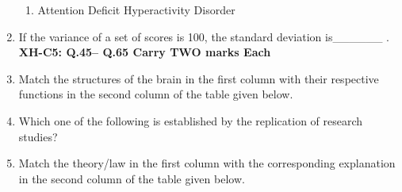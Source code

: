 \documentclass[12pt]{article}
\theoremstyle{remark}
\begin{document}
\begin{enumerate}
\begin{enumerate}
    \item Attention Deficit Hyperactivity Disorder
\end{enumerate}
\hfill{}
\item If the variance of a set of scores is 100, the standard deviation is\_\_\_\_\_\_ .
\hfill{}
\newpage
\textbf{XH-C5: Q.45– Q.65 Carry TWO marks Each}
\item Match the structures of the brain in the first column with their respective functions in the second column of the table given below.
\begin{table}[H]
    \centering
    
    \caption{}
    \label{tab:5.1}
\end{table}
\begin{enumerate}  \end{enumerate}
\hfill{}
\item Which one of the following is established by the replication of research studies?
\begin{enumerate}
\end{enumerate}
\hfill{}
\item Match the theory/law in the first column with the corresponding explanation in the second column of the table given below.
\begin{table}[H]
    \centering
    
    \caption{}
    \label{tab:5.2}
\end{table}
\begin{enumerate} 
\end{enumerate}
\end{enumerate}
\end{document}
